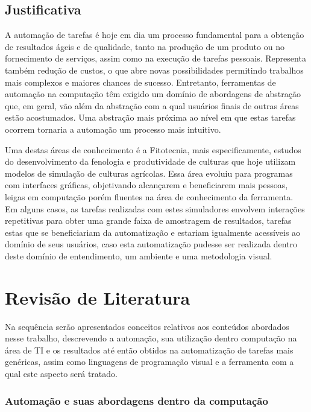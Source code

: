 \documentclass[tg]{mdtufsm}
\begin{document}
	\section{Justificativa}

	A automação de tarefas é hoje em dia um processo fundamental para a obtenção de resultados ágeis e de qualidade, tanto na produção de um produto ou no fornecimento de serviços, assim como na execução de tarefas pessoais. Representa também redução de custos, o que abre novas possibilidades permitindo trabalhos mais complexos e maiores chances de sucesso. Entretanto, ferramentas de automação na computação têm exigido um domínio de abordagens de abstração que, em geral, vão além da abstração com a qual usuários finais de outras áreas estão acostumados. Uma abstração mais próxima ao nível em que estas tarefas ocorrem tornaria a automação um processo mais intuitivo.

	Uma destas áreas de conhecimento é a Fitotecnia, mais especificamente, estudos do desenvolvimento da fenologia e produtividade de culturas que hoje utilizam modelos de simulação de culturas agrícolas. Essa área evoluiu para programas com interfaces gráficas, objetivando alcançarem e beneficiarem mais pessoas, leigas em computação porém fluentes na área de conhecimento da ferramenta. Em alguns casos, as tarefas realizadas com estes simuladores envolvem interações repetitivas para obter uma grande faixa de amostragem de resultados, tarefas estas que se beneficiariam da automatização e estariam igualmente acessíveis ao domínio de seus usuários, caso esta automatização pudesse ser realizada dentro deste domínio de entendimento, um ambiente e uma metodologia visual.

	\chapter{Revisão de Literatura}
	Na sequência serão apresentados conceitos relativos aos conteúdos abordados nesse trabalho, descrevendo a automação, sua utilização dentro computação na área de TI e os resultados até então obtidos na automatização de tarefas mais genéricas, assim como linguagens de programação visual e a ferramenta com a qual este aspecto será tratado.


	\subsection{Automação e suas abordagens dentro da computação}
\end{document}
